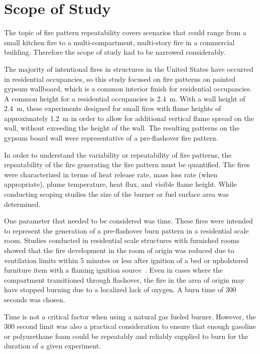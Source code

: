 \documentclass[twoside]{uocthesis}
\begin{document}
\section{Scope of Study}

The topic of fire pattern repeatability covers scenarios that could range from a small kitchen fire to a multi-compartment, multi-story fire in a commercial building.  Therefore the scope of study had to be narrowed considerably. 

The majority of intentional fires in structures in the United States have occurred in residential occupancies, so this study focused on fire patterns on painted gypsum wallboard, which is a common interior finish for residential occupancies.  A common height for a residential occupancies is 2.4~m.  With a wall height of 2.4~m, these experiments designed for small fires with flame heights of approximately 1.2~m in order to allow for additional vertical flame spread on the wall, without exceeding the height of the wall. The resulting patterns on the gypsum board wall were representative of a pre-flashover fire pattern.

In order to understand the variability or repeatability of fire patterns, the repeatability of the fire generating the fire pattern must be quantified.  The fires were characterized in terms of heat release rate, mass loss rate (when appropriate), plume temperature, heat flux, and visible flame height. While conducting scoping studies the size of the burner or fuel surface area was determined.  

One parameter that needed to be considered was time.  These fires were intended to represent the generation of a pre-flashover burn pattern in a residential scale room. Studies conducted in residential scale structures with furnished rooms showed that the fire development in the room of origin was reduced due to ventilation limits within 5 minutes or less after ignition of a bed or upholstered furniture item with a flaming ignition source~\cite{Kerber:2010,Madrzykowski:2009}. Even in cases where the compartment transitioned through flashover, the fire in the area of origin may have stopped burning due to a localized lack of oxygen. A burn time of 300 seconds was chosen.

Time is not a critical factor when using a natural gas fueled burner.  However, the 300 second limit was also a practical consideration to ensure that enough gasoline or polyurethane foam could be repeatably and reliably supplied to burn for the duration of a given experiment.  
\end{document}
